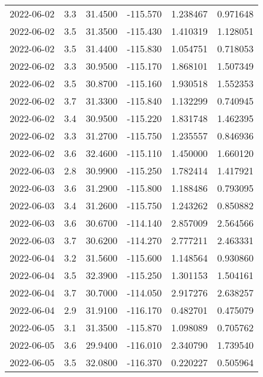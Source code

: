\begin{tabular}{lrrrrr}
2022-06-02 &       3.3 &  31.4500 &  -115.570 &         1.238467 &         0.971648 \\
2022-06-02 &       3.5 &  31.3500 &  -115.430 &         1.410319 &         1.128051 \\
2022-06-02 &       3.5 &  31.4400 &  -115.830 &         1.054751 &         0.718053 \\
2022-06-02 &       3.3 &  30.9500 &  -115.170 &         1.868101 &         1.507349 \\
2022-06-02 &       3.5 &  30.8700 &  -115.160 &         1.930518 &         1.552353 \\
2022-06-02 &       3.7 &  31.3300 &  -115.840 &         1.132299 &         0.740945 \\
2022-06-02 &       3.4 &  30.9500 &  -115.220 &         1.831748 &         1.462395 \\
2022-06-02 &       3.3 &  31.2700 &  -115.750 &         1.235557 &         0.846936 \\
2022-06-02 &       3.6 &  32.4600 &  -115.110 &         1.450000 &         1.660120 \\
2022-06-03 &       2.8 &  30.9900 &  -115.250 &         1.782414 &         1.417921 \\
2022-06-03 &       3.6 &  31.2900 &  -115.800 &         1.188486 &         0.793095 \\
2022-06-03 &       3.4 &  31.2600 &  -115.750 &         1.243262 &         0.850882 \\
2022-06-03 &       3.6 &  30.6700 &  -114.140 &         2.857009 &         2.564566 \\
2022-06-03 &       3.7 &  30.6200 &  -114.270 &         2.777211 &         2.463331 \\
2022-06-04 &       3.2 &  31.5600 &  -115.600 &         1.148564 &         0.930860 \\
2022-06-04 &       3.5 &  32.3900 &  -115.250 &         1.301153 &         1.504161 \\
2022-06-04 &       3.7 &  30.7000 &  -114.050 &         2.917276 &         2.638257 \\
2022-06-04 &       2.9 &  31.9100 &  -116.170 &         0.482701 &         0.475079 \\
2022-06-05 &       3.1 &  31.3500 &  -115.870 &         1.098089 &         0.705762 \\
2022-06-05 &       3.6 &  29.9400 &  -116.010 &         2.340790 &         1.739540 \\
2022-06-05 &       3.5 &  32.0800 &  -116.370 &         0.220227 &         0.505964 \\

\end{tabular}
